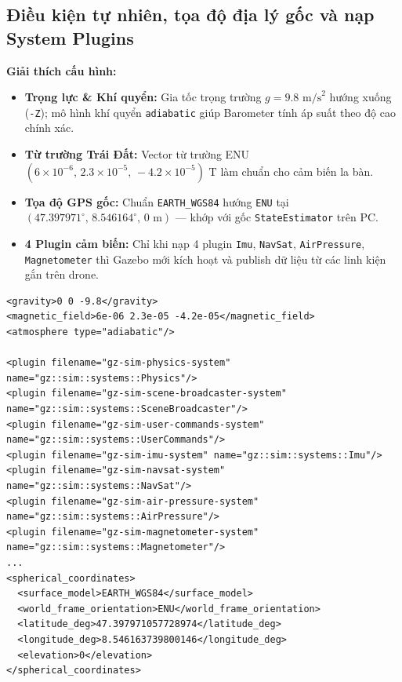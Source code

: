 \documentclass[11pt,a4paper]{article}
\begin{document}
\subsection{Điều kiện tự nhiên, tọa độ địa lý gốc và nạp System Plugins}
\noindent
\begin{minipage}[t]{0.45\textwidth}
\vspace{0pt}
\textbf{Giải thích cấu hình:}
\begin{itemize}
    \item \textbf{Trọng lực \& Khí quyển:} Gia tốc trọng trường $g = 9.8\text{ m/s}^2$ hướng xuống (\texttt{-Z}); mô hình khí quyển \texttt{adiabatic} giúp Barometer tính áp suất theo độ cao chính xác.
    \item \textbf{Từ trường Trái Đất:} Vector từ trường ENU $(6\times 10^{-6},\, 2.3\times 10^{-5},\, -4.2\times 10^{-5})\text{ T}$ làm chuẩn cho cảm biến la bàn.
    \item \textbf{Tọa độ GPS gốc:} Chuẩn \texttt{EARTH\_WGS84} hướng \texttt{ENU} tại $(47.397971^\circ,\, 8.546164^\circ,\, 0\text{ m})$ — khớp với gốc \texttt{StateEstimator} trên PC.
    \item \textbf{4 Plugin cảm biến:} Chỉ khi nạp 4 plugin \texttt{Imu}, \texttt{NavSat}, \texttt{AirPressure}, \texttt{Magnetometer} thì Gazebo mới kích hoạt và publish dữ liệu từ các linh kiện gắn trên drone.
\end{itemize}
\end{minipage}
\hfill
\begin{minipage}[t]{0.52\textwidth}
\vspace{0pt}
\begin{lstlisting}[language=SDF, firstnumber=23]
<gravity>0 0 -9.8</gravity>
<magnetic_field>6e-06 2.3e-05 -4.2e-05</magnetic_field>
<atmosphere type="adiabatic"/>

<plugin filename="gz-sim-physics-system" name="gz::sim::systems::Physics"/>
<plugin filename="gz-sim-scene-broadcaster-system" name="gz::sim::systems::SceneBroadcaster"/>
<plugin filename="gz-sim-user-commands-system" name="gz::sim::systems::UserCommands"/>
<plugin filename="gz-sim-imu-system" name="gz::sim::systems::Imu"/>
<plugin filename="gz-sim-navsat-system" name="gz::sim::systems::NavSat"/>
<plugin filename="gz-sim-air-pressure-system" name="gz::sim::systems::AirPressure"/>
<plugin filename="gz-sim-magnetometer-system" name="gz::sim::systems::Magnetometer"/>
...
<spherical_coordinates>
  <surface_model>EARTH_WGS84</surface_model>
  <world_frame_orientation>ENU</world_frame_orientation>
  <latitude_deg>47.397971057728974</latitude_deg>
  <longitude_deg>8.546163739800146</longitude_deg>
  <elevation>0</elevation>
</spherical_coordinates>
\end{lstlisting}
\end{minipage}
\end{document}
